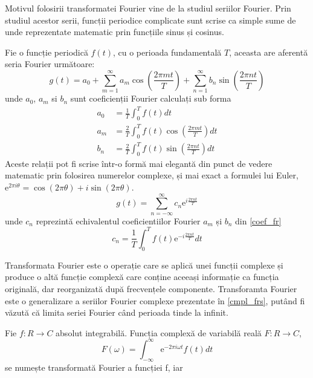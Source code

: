 \documentclass[a4paper,12pt]{book}
\begin{document}
			Motivul folosirii transformatei Fourier vine de la studiul seriilor Fourier. Prin studiul acestor serii, funcții periodice complicate sunt scrise ca simple sume de unde reprezentate matematic prin funcțiile sinus și cosinus.\par
			
			Fie o funcție periodică $f(t)$, cu o perioada fundamentală $T$, aceasta are aferentă seria Fourier următoare:
			\begin{equation}
				g(t) = a_0 + \sum_{m=1}^{\infty} a_m \cos(\frac{2\pi m t}{T}) + \sum_{n=1}^{\infty} b_n \sin(\frac{2\pi n t}{T})
			\end{equation}			
			unde $a_0$, $a_m$ si $b_n$ sunt coeficienții Fourier calculați sub forma			 
			\begin{align}
			\nonumber 	a_0 &= \frac{1}{T} \int_{0}^{T} f(t) dt\\
			\nonumber 	a_m &= \frac{2}{T} \int_{0}^{T} f(t) \cos(\frac{2 \pi m t}{T}) dt \\ 
						b_n &= \frac{2}{T} \int_{0}^{T} f(t) \sin(\frac{2 \pi n t}{T}) dt \label{coef_fr}
			\end{align}
			Aceste relații pot fi scrise într-o formă mai elegantă din punct de vedere matematic prin folosirea numerelor complexe, și mai exact a formulei lui Euler, \(\mathrm{e}^{2\pi i\theta} = \cos (2\pi \theta) + i \sin (2\pi \theta)\).			
			\begin{equation} \label{cmpl_frs}
				g(t) = \sum_{n=-\infty}^{\infty} c_n  \mathrm{e}^{i \frac{2\pi n t}{T}} 
			\end{equation}
			unde $c_n$ reprezintă echivalentul coeficientiilor Fourier $a_m$ și $b_n$ din \ref{coef_fr}			
			\begin{equation*}
			 	c_n = \frac{1}{T} \int_{0}^{T} f(t) \mathrm{e}^{-i \frac{2\pi n t}{T}} dt
			\end{equation*}
			
			Transformata Fourier este o operație care se aplică unei funcții complexe și produce o altă funcție complexă care conține aceeași informație ca funcția originală, dar reorganizată după frecvențele componente. Transforamta Fourier este o generalizare a seriilor Fourier complexe prezentate în \ref{cmpl_frs}, putând fi văzută că limita seriei Fourier când perioada tinde la infinit.
			
			Fie $f : R \to C$ absolut integrabilă. Funcția complexă de variabilă reală	$F : R \to C$,
			\begin{equation*}
						F(\omega) = \int_{-\infty}^{\infty}  \mathrm{e}^{-2\pi i\omega t} f(t) dt
			\end{equation*}
				se numește transformată Fourier a funcției f, iar
			
\end{document}
